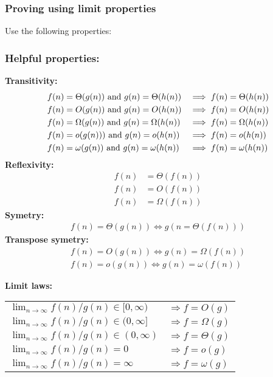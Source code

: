 \documentclass{article}
\begin{document}
            \subsubsection{Proving using limit properties}
            Use the following properties:
            \subsubsection{Helpful properties:}
            \textbf{Transitivity: }
            \begin{align*}
                f(n) &= \Theta(g(n)) \text{ and } g(n) = \Theta(h(n)) &\implies f(n) &= \Theta(h(n))\\
                f(n) &= O(g(n)) \text{ and } g(n) = O(h(n)) &\implies f(n) &= O(h(n))\\
                f(n) &= \Omega(g(n)) \text{ and } g(n) = \Omega(h(n)) &\implies f(n) &= \Omega(h(n))\\
                f(n) &= o(g(n))) \text{ and } g(n) = o(h(n)) &\implies f(n) &= o(h(n))\\
                f(n) &= \omega(g(n)) \text{ and } g(n) = \omega(h(n)) &\implies f(n) &= \omega (h(n))
            \end{align*}
            \textbf{Reflexivity: }
            \begin{align*}
                f(n) &= \Theta(f(n))\\
                f(n) &= O(f(n))\\
                f(n) &= \Omega(f(n))
            \end{align*}
            \textbf{Symetry: }
            \begin{align*}
                f(n) = \Theta (g(n)) \iff g(n = \Theta(f(n)))
            \end{align*}
            \textbf{Transpose symetry: }
            \begin{align*}
                f(n) = O(g(n)) \iff g(n) = \Omega(f(n))\\
                f(n) = o(g(n)) \iff g(n) = \omega (f(n))
            \end{align*}

            \textbf{Limit laws: }

            {\centering
            	\begin{tabular}{ll}
            	$\lim_{n\to\infty}f(n)/g(n) \in[0,\infty)$ &	$\Rightarrow f= O(g)$ \\
            	$\lim_{n\to\infty}f(n)/g(n) \in (0,\infty] $ &		$\Rightarrow f= \Omega(g)$ \\
            	$\lim_{n\to\infty}f(n)/g(n) \in (0,\infty)$  &	$\Rightarrow f= \Theta(g)$ \\
            	$\lim_{n\to\infty}f(n)/g(n) = 0$  &	$\Rightarrow f= o(g)$ \\
            	$\lim_{n\to\infty}f(n)/g(n) = \infty$  &	$\Rightarrow f= \omega(g)$
            	\end{tabular}\par
            }
\end{document}
